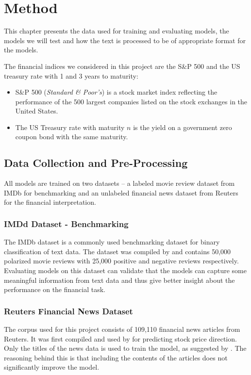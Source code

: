 \chapter{Method}

This chapter presents the data used for training and evaluating models, the models we will test and how the text is processed to be of appropriate format for the models. 

The financial indices we considered in this project are the S\&P 500 and the US treasury rate with 1 and 3 years to maturity:
\begin{itemize}
    \item S\&P 500 (\textit{Standard \& Poor's}) is a stock market index reflecting the performance of the 500 largest companies listed on the stock exchanges in the United States.
    \item The US Treasury rate with maturity $n$ is the yield on a government zero coupon bond with the same maturity. 
\end{itemize}

\section{Data Collection and Pre-Processing}

All models are trained on two datasets -- a labeled movie review dataset from IMDb for benchmarking and an unlabeled financial news dataset from Reuters for the financial interpretation. 

\subsection{IMDd Dataset - Benchmarking}
The IMDb dataset is a commonly used benchmarking dataset for binary classification of text data. The dataset was compiled by \citet{maas-EtAl:2011:ACL-HLT2011} and contains 50,000 polarized movie reviews with 25,000 positive and negative reviews respectively. Evaluating models on this dataset can validate that the models can capture some meaningful information from text data and thus give better insight about the performance on the financial task. 

\subsection{Reuters Financial News Dataset}

The corpus used for this project consists of 109,110 financial news articles from Reuters. It was first compiled and used by \citet{ding2014using} for predicting stock price direction. Only the titles of the news data is used to train the model, as suggested by \citet{ding2014using}. The reasoning behind this is that including the contents of the articles does not significantly improve the model. 

